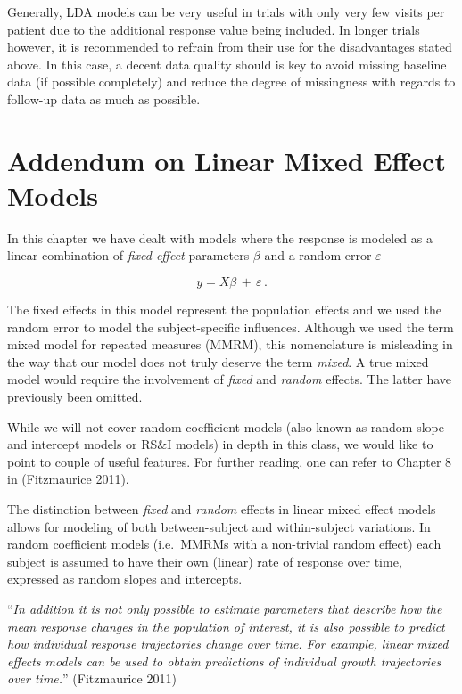 \documentclass[
  letterpaper,
  DIV=11,
  numbers=noendperiod]{scrreprt}
\begin{document}
Generally, LDA models can be very useful in trials with only very few
visits per patient due to the additional response value being included.
In longer trials however, it is recommended to refrain from their use
for the disadvantages stated above. In this case, a decent data quality
should is key to avoid missing baseline data (if possible completely)
and reduce the degree of missingness with regards to follow-up data as
much as possible.

\hypertarget{addendum-on-linear-mixed-effect-models}{%
\section{Addendum on Linear Mixed Effect
Models}\label{addendum-on-linear-mixed-effect-models}}

In this chapter we have dealt with models where the response is modeled
as a linear combination of \emph{fixed effect} parameters \(\beta\) and
a random error \(\varepsilon\)

\[
y = X\beta\,+\,\varepsilon\,.
\]

The fixed effects in this model represent the population effects and we
used the random error to model the subject-specific influences. Although
we used the term mixed model for repeated measures (MMRM), this
nomenclature is misleading in the way that our model does not truly
deserve the term \emph{mixed}. A true mixed model would require the
involvement of \emph{fixed} and \emph{random} effects. The latter have
previously been omitted.

While we will not cover random coefficient models (also known as random
slope and intercept models or RS\&I models) in depth in this class, we
would like to point to couple of useful features. For further reading,
one can refer to Chapter 8 in (Fitzmaurice 2011).

The distinction between \emph{fixed} and \emph{random} effects in linear
mixed effect models allows for modeling of both between-subject and
within-subject variations. In random coefficient models (i.e.~MMRMs with
a non-trivial random effect) each subject is assumed to have their own
(linear) rate of response over time, expressed as random slopes and
intercepts.

``\emph{In addition it is not only possible to estimate parameters that
describe how the mean response changes in the population of interest, it
is also possible to predict how individual response trajectories change
over time. For example, linear mixed effects models can be used to
obtain predictions of individual growth trajectories over time.}''
(Fitzmaurice 2011)
\end{document}
